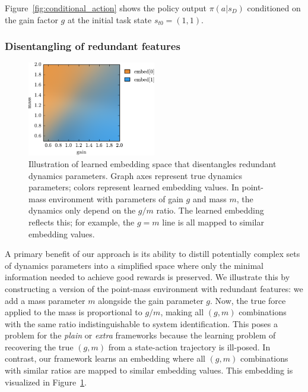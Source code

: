 \documentclass{article}
\newcommand{\TODO}[1]{}
\newcommand{\plain}{\emph{plain}}
\newcommand{\extra}{\emph{extra}}
\begin{document}
Figure~\ref{fig:conditional_action} shows the policy output $\pi(a|s_D)$ conditioned on
the gain factor $g$ at the initial task state $s_{t0} = (1, 1)$.

\subsubsection{Disentangling of redundant features}

\begin{figure}
\centering
\includegraphics[width=0.5\textwidth]{embed_colors.pdf}
\caption{
Illustration of learned embedding space that disentangles redundant dynamics parameters.
Graph axes represent true dynamics parameters; colors represent learned embedding values.
In point-mass environment with parameters of gain $g$ and mass $m$,
the dynamics only depend on the $g/m$ ratio.
The learned embedding reflects this; for example, the $g=m$ line is all mapped to similar embedding values.
}
\label{fig:embed_colors}
\end{figure}
A primary benefit of our approach is its ability to distill potentially complex sets of dynamics parameters
into a simplified space where only the minimal information needed to achieve good rewards is preserved.
We illustrate this by constructing a version of the point-mass environment with redundant features:
we add a mass parameter $m$ alongside the gain parameter $g$.
Now, the true force applied to the mass is proportional to $g/m$,
making all $(g, m)$ combinations with the same ratio indistinguishable to system identification.
This poses a problem for the \plain{} or \extra{} frameworks
because the learning problem of recovering the true $(g, m)$ from a state-action trajectory is ill-posed.
In contrast, our framework learns an embedding where all $(g, m)$ combinations with similar ratios are mapped to similar embedding values.
This embedding is visualized in Figure~\ref{fig:embed_colors}.

\end{document}
